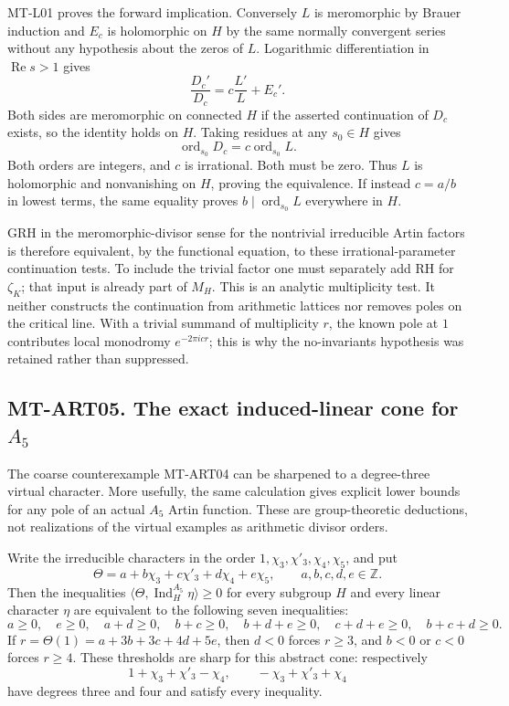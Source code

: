 \documentclass[11pt,a4paper]{article}
\begin{document}
MT-L01 proves the forward implication.  Conversely $L$ is meromorphic by
Brauer induction and $E_c$ is holomorphic on $H$ by the same normally
convergent series without any hypothesis about the zeros of $L$.
Logarithmic differentiation in $\operatorname{Re}s>1$ gives
\[
 \frac{D_c'}{D_c}=c\frac{L'}L+E_c'.
\]
Both sides are meromorphic on connected $H$ if the asserted continuation
of $D_c$ exists, so the identity holds on $H$.  Taking residues at any
$s_0\in H$ gives
\[
 \operatorname{ord}_{s_0}D_c
      =c\operatorname{ord}_{s_0}L.
\]
Both orders are integers, and $c$ is irrational.  Both must be zero.
Thus $L$ is holomorphic and nonvanishing on $H$, proving the equivalence.
If instead $c=a/b$ in lowest terms, the same equality proves
$b\mid\operatorname{ord}_{s_0}L$ everywhere in $H$.

GRH in the meromorphic-divisor sense for the nontrivial irreducible Artin
factors is therefore equivalent, by the functional equation, to these
irrational-parameter continuation tests.  To include the trivial factor one
must separately add RH for $\zeta_K$; that input is already part of $M_H$.
This is an analytic multiplicity test.  It neither constructs the
continuation from arithmetic lattices nor removes poles on the critical
line.  With a trivial summand of multiplicity $r$, the known pole at $1$
contributes local monodromy $e^{-2\pi i c r}$; this is why the no-invariants
hypothesis was retained rather than suppressed.

\subsection*{MT-ART05. The exact induced-linear cone for \texorpdfstring{$A_5$}{A5}}
The coarse counterexample MT-ART04 can be sharpened to a degree-three
virtual character. More usefully, the same calculation gives explicit
lower bounds for any pole of an actual $A_5$ Artin function. These are
group-theoretic deductions, not realizations of the virtual examples as
arithmetic divisor orders.

Write the irreducible characters in the order
$1,\chi_3,\chi'_3,\chi_4,\chi_5$, and put
\[
 \Theta=a+b\chi_3+c\chi'_3+d\chi_4+e\chi_5,
 \qquad a,b,c,d,e\in\mathbb Z.
\]
Then the inequalities
$\langle\Theta,\operatorname{Ind}_H^{A_5}\eta\rangle\ge0$ for
every subgroup $H$ and every linear character $\eta$ are equivalent to
the following seven inequalities:
\[
 a\ge0,\quad e\ge0,\quad a+d\ge0,\quad b+c\ge0,\quad
 b+d+e\ge0,\quad c+d+e\ge0,\quad b+c+d\ge0.       \tag{MT-A5-cone}
\]
If $r=\Theta(1)=a+3b+3c+4d+5e$, then $d<0$ forces $r\ge3$,
and $b<0$ or $c<0$ forces $r\ge4$. These thresholds are sharp for
this abstract cone: respectively
\[
       1+\chi_3+\chi'_3-\chi_4,
       \qquad -\chi_3+\chi'_3+\chi_4               \tag{MT-A5-ex}
\]
have degrees three and four and satisfy every inequality.
\end{document}
